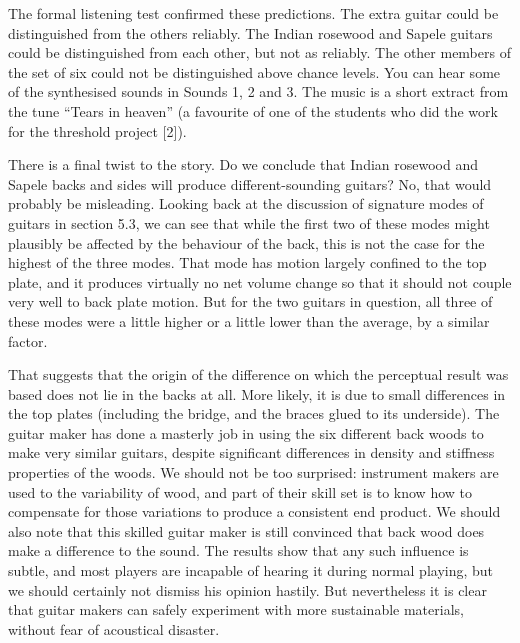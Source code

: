   The formal listening test confirmed these predictions. The extra guitar could 
  be distinguished from the others reliably. The Indian rosewood and Sapele 
  guitars could be distinguished from each other, but not as reliably. The 
  other members of the set of six could not be distinguished above chance 
  levels. You can hear some of the synthesised sounds in Sounds 1, 2 and 3. The 
  music is a short extract from the tune “Tears in heaven” (a favourite of one 
  of the students who did the work for the threshold project [2]). 

\audio{}

\audio{}

\audio{}

  There is a final twist to the story. Do we conclude that Indian rosewood and 
  Sapele backs and sides will produce different-sounding guitars? No, that 
  would probably be misleading. Looking back at the discussion of signature 
  modes of guitars in section 5.3, we can see that while the first two of these 
  modes might plausibly be affected by the behaviour of the back, this is not 
  the case for the highest of the three modes. That mode has motion largely 
  confined to the top plate, and it produces virtually no net volume change so 
  that it should not couple very well to back plate motion. But for the two 
  guitars in question, all three of these modes were a little higher or a 
  little lower than the average, by a similar factor. 

  That suggests that the origin of the difference on which the perceptual 
  result was based does not lie in the backs at all. More likely, it is due to 
  small differences in the top plates (including the bridge, and the braces 
  glued to its underside). The guitar maker has done a masterly job in using 
  the six different back woods to make very similar guitars, despite 
  significant differences in density and stiffness properties of the woods. We 
  should not be too surprised: instrument makers are used to the variability of 
  wood, and part of their skill set is to know how to compensate for those 
  variations to produce a consistent end product. We should also note that this 
  skilled guitar maker is still convinced that back wood does make a difference 
  to the sound. The results show that any such influence is subtle, and most 
  players are incapable of hearing it during normal playing, but we should 
  certainly not dismiss his opinion hastily. But nevertheless it is clear that 
  guitar makers can safely experiment with more sustainable materials, without 
  fear of acoustical disaster. 

